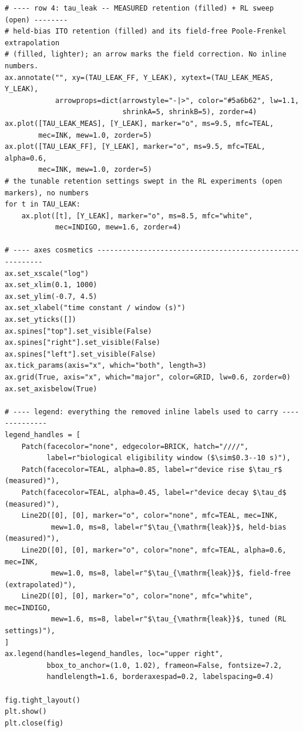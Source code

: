 \begin{lstlisting}[caption={schematics.ipynb code cell 11},label={lst:mrl-nb-schematics-11}]
# ---- row 4: tau_leak -- MEASURED retention (filled) + RL sweep (open) --------
# held-bias ITO retention (filled) and its field-free Poole-Frenkel extrapolation
# (filled, lighter); an arrow marks the field correction. No inline numbers.
ax.annotate("", xy=(TAU_LEAK_FF, Y_LEAK), xytext=(TAU_LEAK_MEAS, Y_LEAK),
            arrowprops=dict(arrowstyle="-|>", color="#5a6b62", lw=1.1,
                            shrinkA=5, shrinkB=5), zorder=4)
ax.plot([TAU_LEAK_MEAS], [Y_LEAK], marker="o", ms=9.5, mfc=TEAL,
        mec=INK, mew=1.0, zorder=5)
ax.plot([TAU_LEAK_FF], [Y_LEAK], marker="o", ms=9.5, mfc=TEAL, alpha=0.6,
        mec=INK, mew=1.0, zorder=5)
# the tunable retention settings swept in the RL experiments (open markers), no numbers
for t in TAU_LEAK:
    ax.plot([t], [Y_LEAK], marker="o", ms=8.5, mfc="white",
            mec=INDIGO, mew=1.6, zorder=4)

# ---- axes cosmetics ---------------------------------------------------------
ax.set_xscale("log")
ax.set_xlim(0.1, 1000)
ax.set_ylim(-0.7, 4.5)
ax.set_xlabel("time constant / window (s)")
ax.set_yticks([])
ax.spines["top"].set_visible(False)
ax.spines["right"].set_visible(False)
ax.spines["left"].set_visible(False)
ax.tick_params(axis="x", which="both", length=3)
ax.grid(True, axis="x", which="major", color=GRID, lw=0.6, zorder=0)
ax.set_axisbelow(True)

# ---- legend: everything the removed inline labels used to carry --------------
legend_handles = [
    Patch(facecolor="none", edgecolor=BRICK, hatch="////",
          label=r"biological eligibility window ($\sim$0.3--10 s)"),
    Patch(facecolor=TEAL, alpha=0.85, label=r"device rise $\tau_r$ (measured)"),
    Patch(facecolor=TEAL, alpha=0.45, label=r"device decay $\tau_d$ (measured)"),
    Line2D([0], [0], marker="o", color="none", mfc=TEAL, mec=INK,
           mew=1.0, ms=8, label=r"$\tau_{\mathrm{leak}}$, held-bias (measured)"),
    Line2D([0], [0], marker="o", color="none", mfc=TEAL, alpha=0.6, mec=INK,
           mew=1.0, ms=8, label=r"$\tau_{\mathrm{leak}}$, field-free (extrapolated)"),
    Line2D([0], [0], marker="o", color="none", mfc="white", mec=INDIGO,
           mew=1.6, ms=8, label=r"$\tau_{\mathrm{leak}}$, tuned (RL settings)"),
]
ax.legend(handles=legend_handles, loc="upper right",
          bbox_to_anchor=(1.0, 1.02), frameon=False, fontsize=7.2,
          handlelength=1.6, borderaxespad=0.2, labelspacing=0.4)

fig.tight_layout()
plt.show()
plt.close(fig)
\end{lstlisting}

